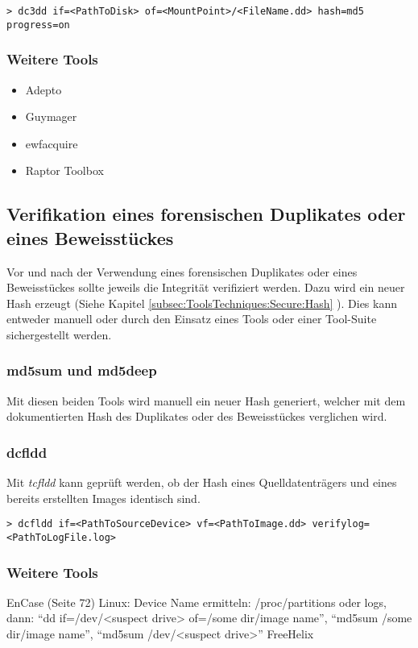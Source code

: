\begin{lstlisting}
> dc3dd if=<PathToDisk> of=<MountPoint>/<FileName.dd> hash=md5 progress=on
\end{lstlisting}


\subsubsection{Weitere Tools}

\begin{itemize}
\item Adepto
\item Guymager
\item ewfacquire
\item Raptor Toolbox
\end{itemize}




\subsection{Verifikation eines forensischen Duplikates oder eines Beweisstückes}
Vor und nach der Verwendung eines forensischen Duplikates oder eines Beweisstückes sollte jeweils die Integrität verifiziert werden. Dazu wird ein neuer Hash erzeugt (Siehe Kapitel \ref{subsec:ToolsTechniques:Secure:Hash} ). Dies kann entweder manuell oder durch den Einsatz eines Tools oder einer Tool-Suite sichergestellt werden.

\subsubsection{md5sum und md5deep}
Mit diesen beiden Tools wird manuell ein neuer Hash generiert, welcher mit dem dokumentierten Hash des Duplikates oder des Beweisstückes verglichen wird.

\subsubsection{dcfldd}
Mit \textit{tcfldd} kann geprüft werden, ob der Hash eines Quelldatenträgers und eines bereits erstellten Images identisch sind.

\begin{lstlisting}
> dcfldd if=<PathToSourceDevice> vf=<PathToImage.dd> verifylog=<PathToLogFile.log>
\end{lstlisting}

\subsubsection{Weitere Tools} 
EnCase (Seite 72)
Linux: Device Name ermitteln: /proc/partitions oder logs, dann: "`dd if=/dev/<suspect drive> of=/some dir/image name"', "`md5sum /some dir/image name"', "`md5sum /dev/<suspect drive>"'
FreeHelix

